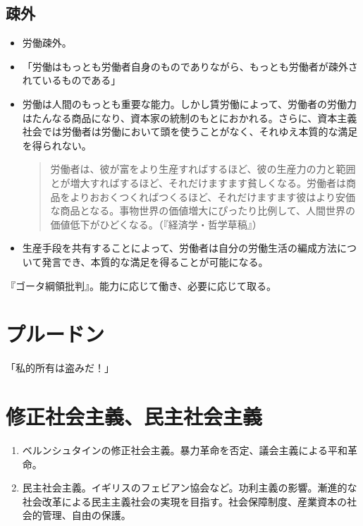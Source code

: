 \documentclass[uplatex,dvipdfmx]{jsarticle} \usepackage{mystyle}%
\begin{document}
\subsection{疎外}

\begin{itemize}
\item 労働疎外。


\item 「労働はもっとも労働者自身のものでありながら、もっとも労働者が疎外されているものである」
\item 労働は人間のもっとも重要な能力。しかし賃労働によって、労働者の労働力はたんなる商品になり、資本家の統制のもとにおかれる。さらに、資本主義社会では労働者は労働において頭を使うことがなく、それゆえ本質的な満足を得られない。

  \begin{quote}
    労働者は、彼が富をより生産すればするほど、彼の生産力の力と範囲とが増大すればするほど、それだけますます貧しくなる。労働者は商品をよりおおくつくればつくるほど、それだけますます彼はより安価な商品となる。事物世界の価値増大にぴったり比例して、人間世界の価値低下がひどくなる。（『経済学・哲学草稿』）
  \end{quote}


\item 生産手段を共有することによって、労働者は自分の労働生活の編成方法について発言でき、本質的な満足を得ることが可能になる。

\end{itemize}



『ゴータ綱領批判』。能力に応じて働き、必要に応じて取る。



\section{プルードン}

「私的所有は盗みだ！」


\nocite{高晃公95:マルクス}
\nocite{大川正彦04:マルクス}
\nocite{kymlicka90:_contem_polit_philos}
\nocite{marx1848:_manif_kommun_partei:水田}
\nocite{marx1848:_commun_manif}


\section{修正社会主義、民主社会主義}

\begin{enumerate}
\item ベルンシュタインの修正社会主義。暴力革命を否定、議会主義による平和革命。

\item 民主社会主義。イギリスのフェビアン協会など。功利主義の影響。漸進的な社会改革による民主主義社会の実現を目指す。社会保障制度、産業資本の社会的管理、自由の保護。
\end{enumerate}


\ifx\mybook\undefined



\end{document}
